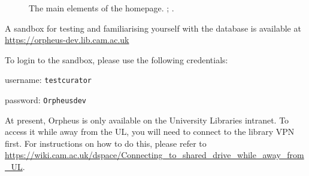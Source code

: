 \documentclass[british, 12pt]{article}
\begin{document}
\begin{figure}
  \caption{The main elements of the homepage. ; .}
  \label{fig-home}
\end{figure}

\begin{tip}[Sandbox]
  A sandbox for testing and familiarising yourself with the database is available at \url{https://orpheus-dev.lib.cam.ac.uk}
  \vspace{1em}

  To login to the sandbox, please use the following credentials:

  username: \texttt{test\textunderscore curator}

  password: \texttt{Orpheus\textunderscore dev}
\end{tip}

\begin{warn}
 At present, Orpheus is only available on the University Libraries intranet. To access it while away from the UL, you will need to connect to the library VPN first. For instructions on how to do this, please refer to \url{https://wiki.cam.ac.uk/dspace/Connecting_to_shared_drive_while_away_from_UL}.
\end{warn}
\end{document}
